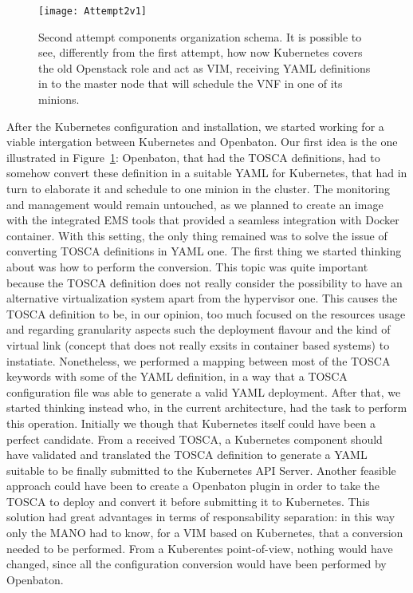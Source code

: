 \begin{figure}[t]
  \centering
  \texttt{[image: Attempt2v1]}
  \caption[Second attempt components organization schema]{Second attempt
    components organization schema. It is possible to see, differently from the
    first attempt, how now Kubernetes covers the old Openstack role and act as
    VIM, receiving YAML definitions in to the master node that will schedule the
    VNF in one of its minions.}
  \label{chap:archimpl:sec:secondattempt:img:schema1}
\end{figure}

After the Kubernetes configuration and installation, we started working for a
viable intergation between Kubernetes and Openbaton. Our first idea is the one
illustrated in Figure~\ref{chap:archimpl:sec:secondattempt:img:schema1}:
Openbaton, that had the TOSCA definitions, had to somehow convert these
definition in a suitable YAML for Kubernetes, that had in turn to elaborate it
and schedule to one minion in the cluster. The monitoring and management would
remain untouched, as we planned to create an image with the integrated EMS tools
that provided a seamless integration with Docker container. With this setting,
the only thing remained was to solve the issue of converting TOSCA definitions
in YAML one. The first thing we started thinking about was how to perform the
conversion. This topic was quite important because the TOSCA definition does not
really consider the possibility to have an alternative virtualization system
apart from the hypervisor one. This causes the TOSCA definition to be, in our
opinion, too much focused on the resources usage and regarding granularity
aspects such the deployment flavour and the kind of virtual link (concept that
does not really exsits in container based systems) to instatiate. Nonetheless,
we performed a mapping between most of the TOSCA keywords with some of the YAML
definition, in a way that a TOSCA configuration file was able to generate a
valid YAML deployment. After that, we started thinking instead who, in the
current architecture, had the task to perform this operation. Initially we
though that Kubernetes itself could have been a perfect candidate. From a
received TOSCA, a Kubernetes component should have validated and translated the
TOSCA definition to generate a YAML suitable to be finally submitted to the
Kubernetes API Server. Another feasible approach could have been to create a
Openbaton plugin in order to take the TOSCA to deploy and convert it before
submitting it to Kubernetes. This solution had great advantages in terms of
responsability separation: in this way only the MANO had to know, for a VIM
based on Kubernetes, that a conversion needed to be performed. From a Kuberentes
point-of-view, nothing would have changed, since all the configuration
conversion would have been performed by Openbaton.

